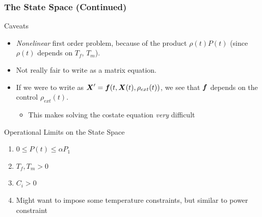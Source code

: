 \documentclass[10pt,compress]{beamer}
\begin{document}
\begin{frame}\frametitle{The State Space (Continued)}
    \begin{block}{Caveats}
        \begin{itemize}
            \item \emph{Nonelinear} first order problem, because of the product $\rho(t)P(t)$ (since $\rho(t)$ depends on $T_f$, $T_m$).
            \item Not really fair to write as a matrix equation.
            \item If we were to write as $\boldsymbol{X}'= \boldsymbol{f}(t, \boldsymbol{X}(t), \rho_{ext}(t))$, we see that $\boldsymbol{f}$ depends on the control $\rho_{ext}(t)$.
                \begin{itemize}
                    \item This makes solving the costate equation \emph{very} difficult
                \end{itemize}
        \end{itemize}
    \end{block}
    \begin{block}{Operational Limits on the State Space}
        \begin{enumerate}
            \item $0 \leq P(t)\leq \alpha P_1$
            \item $T_f,T_m>0$
            \item $C_i >0$
            \item Might want to impose some temperature constraints, but similar to power constraint
        \end{enumerate}
    \end{block}
\end{frame}
\end{document}
